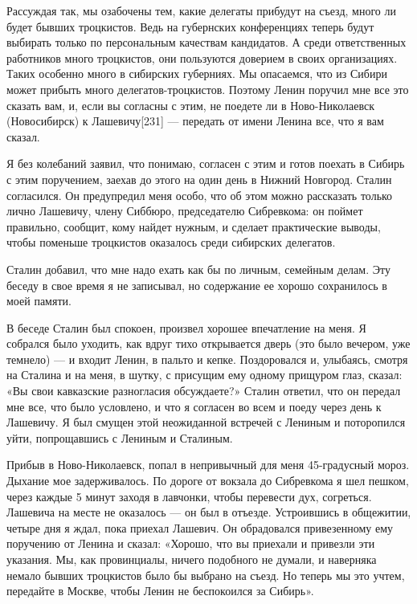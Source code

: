 \documentclass[12pt, a4paper, openany]{book}
\begin{document}
Рассуждая так, мы озабочены тем, какие делегаты прибудут на съезд, много ли будет бывших троцкистов. Ведь на губернских конференциях теперь будут выбирать только по персональным качествам кандидатов. А среди ответственных работников много троцкистов, они пользуются доверием в своих организациях. Таких особенно много в сибирских губерниях. Мы опасаемся, что из Сибири может прибыть много делегатов-троцкистов. Поэтому Ленин поручил мне все это сказать вам, и, если вы согласны с этим, не поедете ли в Ново-Николаевск (Новосибирск) к Лашевичу[231] — передать от имени Ленина все, что я вам сказал.

Я без колебаний заявил, что понимаю, согласен с этим и готов поехать в Сибирь с этим поручением, заехав до этого на один день в Нижний Новгород. Сталин согласился. Он предупредил меня особо, что об этом можно рассказать только лично Лашевичу, члену Сиббюро, председателю Сибревкома: он поймет правильно, сообщит, кому найдет нужным, и сделает практические выводы, чтобы поменьше троцкистов оказалось среди сибирских делегатов.

Сталин добавил, что мне надо ехать как бы по личным, семейным делам. Эту беседу в свое время я не записывал, но содержание ее хорошо сохранилось в моей памяти.

В беседе Сталин был спокоен, произвел хорошее впечатление на меня. Я собрался было уходить, как вдруг тихо открывается дверь (это было вечером, уже темнело) — и входит Ленин, в пальто и кепке. Поздоровался и, улыбаясь, смотря на Сталина и на меня, в шутку, с присущим ему одному прищуром глаз, сказал: «Вы свои кавказские разногласия обсуждаете?» Сталин ответил, что он передал мне все, что было условлено, и что я согласен во всем и поеду через день к Лашевичу. Я был смущен этой неожиданной встречей с Лениным и поторопился уйти, попрощавшись с Лениным и Сталиным.

Прибыв в Ново-Николаевск, попал в непривычный для меня 45-градусный мороз. Дыхание мое задерживалось. По дороге от вокзала до Сибревкома я шел пешком, через каждые 5 минут заходя в лавчонки, чтобы перевести дух, согреться. Лашевича на месте не оказалось — он был в отъезде. Устроившись в общежитии, четыре дня я ждал, пока приехал Лашевич. Он обрадовался привезенному ему поручению от Ленина и сказал: «Хорошо, что вы приехали и привезли эти указания. Мы, как провинциалы, ничего подобного не думали, и наверняка немало бывших троцкистов было бы выбрано на съезд. Но теперь мы это учтем, передайте в Москве, чтобы Ленин не беспокоился за Сибирь».
\end{document}
